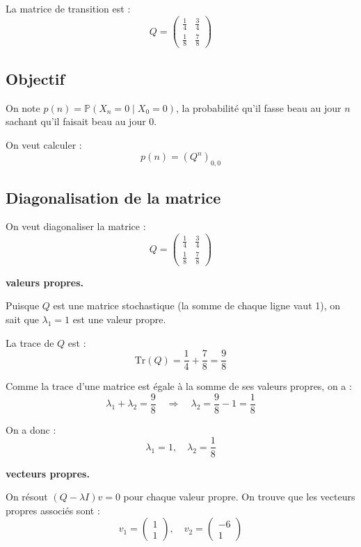 La matrice de transition est :
\[
Q =
\begin{pmatrix}
\frac{1}{4} & \frac{3}{4} \\
\frac{1}{8} & \frac{7}{8}
\end{pmatrix}
\]

\subsection*{Objectif}

On note \( p(n) = \mathbb{P}(X_n = 0 \mid X_0 = 0) \), la probabilité qu’il fasse beau au jour \( n \) sachant qu’il faisait beau au jour 0.

On veut calculer :
\[
p(n) = (Q^n)_{0,0}
\]


\subsection*{Diagonalisation de la matrice}

On veut diagonaliser la matrice :
\[
Q = \begin{pmatrix}
\frac{1}{4} & \frac{3}{4} \\
\frac{1}{8} & \frac{7}{8}
\end{pmatrix}
\]

\vspace{0.5em}
\textbf{valeurs propres.}

Puisque \( Q \) est une matrice stochastique (la somme de chaque ligne vaut 1), on sait que \( \lambda_1 = 1 \) est une valeur propre.

La trace de \( Q \) est :
\[
\mathrm{Tr}(Q) = \frac{1}{4} + \frac{7}{8} = \frac{9}{8}
\]

Comme la trace d'une matrice est égale à la somme de ses valeurs propres, on a :
\[
\lambda_1 + \lambda_2 = \frac{9}{8} \quad \Rightarrow \quad \lambda_2 = \frac{9}{8} - 1 = \frac{1}{8}
\]

On a donc :
\[
\lambda_1 = 1, \quad \lambda_2 = \frac{1}{8}
\]

\vspace{0.5em}
\textbf{vecteurs propres.}

On résout \( (Q - \lambda I) v = 0 \) pour chaque valeur propre. On trouve que les vecteurs propres associés sont :
\[
v_1 = \begin{pmatrix} 1 \\ 1 \end{pmatrix}, \quad v_2 = \begin{pmatrix} -6 \\ 1 \end{pmatrix}
\]

